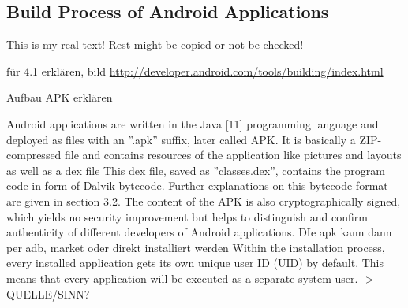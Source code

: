 \subsection{Build Process of Android Applications} \label{subsection:foundation-android-build}
This is my real text! Rest might be copied or not be checked!


für 4.1 erklären, bild
\url{http://developer.android.com/tools/building/index.html}\newline

Aufbau APK erklären\newline

Android applications are written in the Java [11] programming language and deployed as files with an ”.apk” suffix, later called APK. It is basically a ZIP-compressed file and contains resources of the application like pictures and layouts as well as a dex file\newline
This dex file, saved as ”classes.dex”, contains the program code in form of Dalvik bytecode. Further explanations on this bytecode format are given in section 3.2. The content of the APK is also cryptographically signed, which yields no security improvement but helps to distinguish and confirm authenticity of different developers of Android applications.\newline
DIe apk kann dann per adb, market oder direkt installiert werden\newline
Within the installation process, every installed application gets its own unique user ID (UID) by default. This means that every application will be executed as a separate system user. -> QUELLE/SINN?\newline
